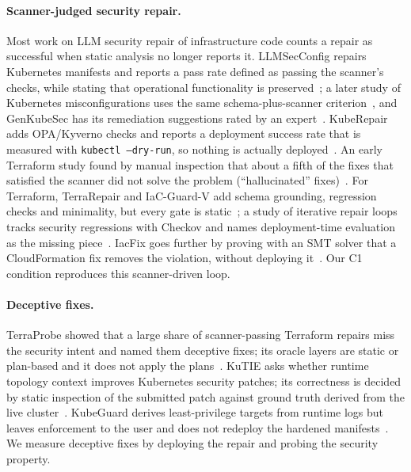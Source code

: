 \documentclass[10pt]{article}
\begin{document}
\paragraph{Scanner-judged security repair.}
Most work on LLM security repair of infrastructure code counts a repair as successful when static analysis no longer
reports it. LLMSecConfig repairs Kubernetes manifests and reports a pass rate defined as passing the scanner's checks,
while stating that operational functionality is preserved~\cite{R0171}; a later study of Kubernetes
misconfigurations uses the same schema-plus-scanner criterion~\cite{R0399}, and GenKubeSec has its remediation
suggestions rated by an expert~\cite{R0033}. KubeRepair adds OPA/Kyverno checks and reports a deployment success rate
that is measured with \texttt{kubectl --dry-run}, so nothing is actually deployed~\cite{R0444}. An early Terraform study
found by manual inspection that about a fifth of the fixes that satisfied the scanner did not solve the problem
(``hallucinated'' fixes)~\cite{R0049}. For Terraform, TerraRepair and IaC-Guard-V add schema grounding, regression
checks and minimality, but every gate is static~\cite{R0494,R0382}; a study of iterative repair loops tracks security
regressions with Checkov and names deployment-time evaluation as the missing piece~\cite{R0330}. IacFix goes further by
proving with an SMT solver that a CloudFormation fix removes the violation, without deploying it~\cite{R0367}. Our C1
condition reproduces this scanner-driven loop.

\paragraph{Deceptive fixes.}
TerraProbe showed that a large share of scanner-passing Terraform repairs miss the security intent and named them
deceptive fixes; its oracle layers are static or plan-based and it does not apply the plans~\cite{R0340}. KuTIE asks
whether runtime topology context improves Kubernetes security patches; its correctness is decided by static
inspection of the submitted patch against ground truth derived from the live cluster~\cite{R0331}. KubeGuard derives
least-privilege targets from runtime logs but leaves enforcement to the user and does not redeploy the hardened
manifests~\cite{R0156}. We measure deceptive fixes by deploying the repair and probing the security property.
\end{document}
